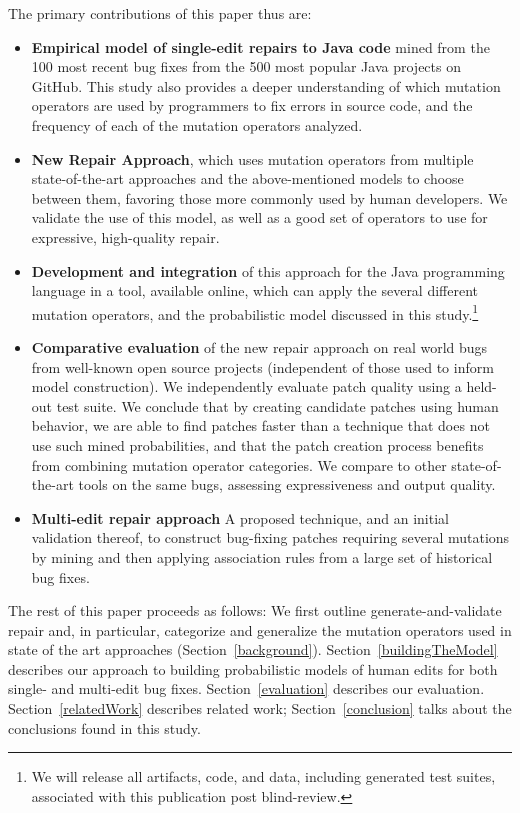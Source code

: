 \documentclass[conference]{IEEEtran}
\begin{document}
%
The primary contributions of this paper thus are:
\begin{itemize}
\item \textbf{Empirical model of single-edit repairs to Java code} mined
      from the 100 most recent bug fixes from the 500 most popular Java projects on
    GitHub. This study also provides a deeper
    understanding of which mutation operators are used by programmers to fix
    errors in source code, and the frequency of each of the mutation operators
    analyzed. 
	\item \textbf{New Repair Approach}, which uses mutation operators
    from multiple state-of-the-art approaches and
    the above-mentioned models to choose between them, favoring those more commonly
    used by human developers.  We validate the use of this model, as well as a
    good set of operators to use for expressive, high-quality repair.
    \item \textbf{Development and integration} of this approach for the Java
      programming language in a tool, available online, which can apply the
      several different mutation operators, and the probabilistic model
      discussed in this study.\footnote{We will release all artifacts, code, and
        data, including generated test suites, associated with this publication post blind-review.} %
  \item \textbf{Comparative evaluation} of the new repair approach on real world bugs from well-known open source projects (independent of those used to inform model
    construction). We independently evaluate patch quality using a held-out test
    suite. We conclude that by creating candidate patches using human behavior,
    we are able to find patches faster than a technique that does not use such
    mined probabilities, and that the patch creation
    process benefits from combining mutation operator categories. We compare to
    other state-of-the-art tools on the same bugs, assessing expressiveness and
    output quality. 
  \item \textbf{Multi-edit repair approach} A proposed technique, and an initial
    validation thereof, to construct 
    bug-fixing patches requiring several mutations by mining and then applying association
    rules from a large set of historical bug fixes. 
\end{itemize}

The rest of this paper proceeds as follows: We first outline
generate-and-validate repair and, in particular, 
categorize and generalize the mutation operators used in state of the art
approaches (Section~\ref{background}). Section~\ref{buildingTheModel}
describes our approach to building probabilistic models of human 
edits for both single- and multi-edit bug fixes. Section~\ref{evaluation}
describes our evaluation. Section~\ref{relatedWork} describes
related work; Section~\ref{conclusion} talks about the conclusions found in this study. 
\end{document}
